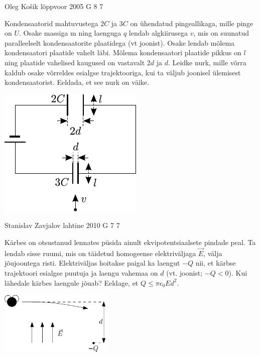 \documentclass[11pt]{article}
\begin{document}
{%
{Oleg Košik} %
{lõppvoor} %
{2005} %
{G 8} %
{7} %
{
\ifStatement
Kondensaatorid mahtuvustega $2C$ ja $3C$ on ühendatud pingeallikaga, mille pinge on $U$. Osake massiga m ning laenguga $q$ lendab algkiirusega $v$, mis on suunatud paralleelselt kondensaatorite plaatidega (vt joonist). Osake lendab mõlema kondensaatori plaatide vahelt läbi. Mõlema kondensaatori plaatide pikkus on $l$ ning plaatide vahelised kaugused on vastavalt $2d$ ja $d$. Leidke nurk, mille võrra kaldub osake võrreldes esialgse trajektooriga, kui ta väljub joonisel ülemisest kondensaatorist. Eeldada, et see nurk on väike.

\begin{center}
	\includegraphics[width=0.6\linewidth]{2005-v3g-08-yl}
\end{center}
\fi
}

{Stanislav Zavjalov} %
{lahtine} %
{2010} %
{G 7} %
{7} %
{
\ifStatement
Kärbes on otsustanud
lennates püsida ainult ekvipotentsiaalsete pindade peal. Ta lendab sisse ruumi,
mis on täidetud homogeense elektriväljaga $\vec{E}$, välja jõujoontega risti.
Elektriväljas hoitakse paigal ka laengut $-Q$ nii, et kärbse
trajektoori esialgse puutuja ja laengu vahemaa on $d$ (vt. joonist; $-Q < 0$).
Kui lähedale kärbes laengule jõuab? Eeldage, et $Q \le \pi\epsilon_0Ed^2$.
\begin{center}
	\includegraphics[width=0.4\textwidth]{2010-lahg-07-muha_tekst}
\end{center}
\fi
}

}
\end{document}
